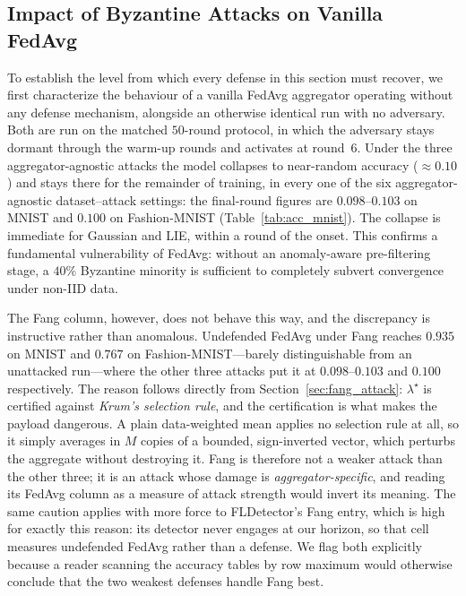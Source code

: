 \documentclass[journal]{IEEEtran}
\begin{document}
\subsection{Impact of Byzantine Attacks on Vanilla FedAvg}

To establish the level from which every defense in this section must recover, we first characterize the behaviour of a vanilla FedAvg aggregator operating without any defense mechanism, alongside an otherwise identical run with no adversary. Both are run on the matched $50$-round protocol, in which the adversary stays dormant through the warm-up rounds and activates at round~$6$. Under the three aggregator-agnostic attacks the model collapses to near-random accuracy ($\approx 0.10$) and stays there for the remainder of training, in every one of the six aggregator-agnostic dataset--attack settings: the final-round figures are $0.098$--$0.103$ on MNIST and $0.100$ on Fashion-MNIST (Table~\ref{tab:acc_mnist}). The collapse is immediate for Gaussian and LIE, within a round of the onset. This confirms a fundamental vulnerability of FedAvg: without an anomaly-aware pre-filtering stage, a $40\%$ Byzantine minority is sufficient to completely subvert convergence under non-IID data.

The Fang column, however, does not behave this way, and the discrepancy is instructive rather than anomalous. Undefended FedAvg under Fang reaches $0.935$ on MNIST and $0.767$ on Fashion-MNIST---barely distinguishable from an unattacked run---where the other three attacks put it at $0.098$--$0.103$ and $0.100$ respectively. The reason follows directly from Section~\ref{sec:fang_attack}: $\lambda^\star$ is certified against \emph{Krum's selection rule}, and the certification is what makes the payload dangerous. A plain data-weighted mean applies no selection rule at all, so it simply averages in $M$ copies of a bounded, sign-inverted vector, which perturbs the aggregate without destroying it. Fang is therefore not a weaker attack than the other three; it is an attack whose damage is \emph{aggregator-specific}, and reading its FedAvg column as a measure of attack strength would invert its meaning. The same caution applies with more force to FLDetector's Fang entry, which is high for exactly this reason: its detector never engages at our horizon, so that cell measures undefended FedAvg rather than a defense. We flag both explicitly because a reader scanning the accuracy tables by row maximum would otherwise conclude that the two weakest defenses handle Fang best.
\end{document}
